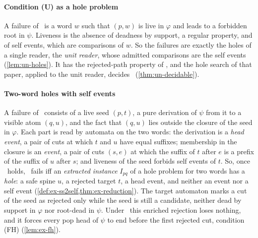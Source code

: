 \paragraph{Condition (U) as a hole problem}
A failure of \CondU\ is a word $w$ such that $(p,w)$ is live in $\varphi$ and
leads to a forbidden root in $\psi$. Liveness is the absence of deadness by
support, a regular property, and of self events, which are comparisons of $w$.
So the failures are exactly the holes of a single reader, the \emph{unit
reader}, whose admitted comparisons are the self events
(\cref{lem:un-holes}). It has the rejected-path property of \citet{Zhao26}, and
the hole search of that paper, applied to the unit reader, decides \CondU\
(\cref{thm:un-decidable}).

\paragraph{Two-word holes with self events}
A failure of \CondII\ consists of a live seed $(p,t)$, a pure derivation of
$\psi$ from it to a visible atom $(q,u)$, and the fact that $(q,u)$ lies
outside the closure of the seed in $\varphi$. Each part is read by automata on
the two words: the derivation is a \emph{head event}, a pair of cuts at which
$t$ and $u$ have equal suffixes; membership in the closure is an \emph{event},
a pair of cuts $(s,e)$ at which the suffix of $t$ after $e$ is a prefix of the
suffix of $u$ after $s$; and liveness of the seed forbids self events of $t$.
So, once \CondU\ holds, \CondII\ fails iff an \emph{extracted instance}
$I_{pq}$ of a hole problem for two words has a \emph{hole}: a safe spine $u$,
a rejected target $t$, a head event, and neither an event nor a self event
(\cref{def:ex-ss2self,thm:ex-reduction}). The target automaton marks a cut of
the seed as rejected only while the seed is still a candidate, neither dead by
support in $\varphi$ nor root-dead in $\psi$. Under \CondU\ this enriched
rejection loses nothing, and it forces every pop head of $\psi$ to end before
the first rejected cut, condition (FH) (\cref{lem:ex-fh}).

